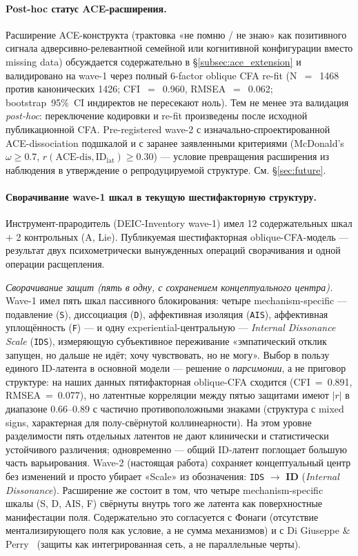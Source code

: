 \paragraph{Post-hoc статус ACE-расширения.} Расширение ACE-конструкта (трактовка «не помню / не знаю» как позитивного сигнала адверсивно-релевантной семейной или когнитивной конфигурации вместо missing data) обсуждается содержательно в §\ref{subsec:ace_extension} и валидировано на wave-1 через полный 6-factor oblique CFA re-fit (N~$=$~1468 против канонических 1426; CFI~$=$~0.960, RMSEA~$=$~0.062; bootstrap~95\%~CI индиректов не пересекают ноль). Тем не менее эта валидация \emph{post-hoc}: переключение кодировки и re-fit произведены после исходной публикационной CFA. Pre-registered wave-2 с изначально-спроектированной ACE-dissociation подшкалой и с заранее заявленными критериями (McDonald's $\omega \ge 0.7$, $r(\text{ACE-dis}, \text{ID}_{\mathrm{lat}}) \ge 0.30$) --- условие превращения расширения из наблюдения в утверждение о репродуцируемой структуре. См. §\ref{sec:future}.

\paragraph{Сворачивание wave-1 шкал в текущую шестифакторную структуру.} Инструмент-прародитель (DEIC-Inventory wave-1) имел 12 содержательных шкал $+$ 2 контрольных (A, Lie). Публикуемая шестифакторная oblique-CFA-модель --- результат двух психометрически вынужденных операций сворачивания и одной операции расщепления.

\emph{Сворачивание защит (пять в одну, с сохранением концептуального центра).} Wave-1 имел пять шкал пассивного блокирования: четыре mechanism-specific --- подавление (\texttt{S}), диссоциация (\texttt{D}), аффективная изоляция (\texttt{AIS}), аффективная уплощённость (\texttt{F}) --- и одну experiential-центральную --- \emph{Internal Dissonance Scale} (\texttt{IDS}), измеряющую субъективное переживание «эмпатический отклик запущен, но дальше не идёт; хочу чувствовать, но не могу». Выбор в пользу единого ID-латента в основной модели --- решение о \emph{парсимонии}, а не приговор структуре: на наших данных пятифакторная oblique-CFA сходится (CFI~=~0.891, RMSEA~=~0.077), но латентные корреляции между пятью защитами имеют $|r|$ в диапазоне $0.66$--$0.89$ с частично противоположными знаками (структура с mixed signs, характерная для полу-свёрнутой коллинеарности). На этом уровне разделимости пять отдельных латентов не дают клинически и статистически устойчивого различения; одновременно --- общий ID-латент поглощает большую часть варьирования. Wave-2 (настоящая работа) сохраняет концептуальный центр без изменений и просто убирает «Scale» из обозначения: \texttt{IDS} $\to$ \textbf{ID} (\emph{Internal Dissonance}). Расширение же состоит в том, что четыре mechanism-specific шкалы (S, D, AIS, F) свёрнуты внутрь того же латента как поверхностные манифестации поля. Содержательно это согласуется с Фонаги (отсутствие ментализирующего поля как условие, а не сумма механизмов) и с Di Giuseppe \& Perry~\citep{digiuseppe2024} (защиты как интегрированная сеть, а не параллельные черты).

